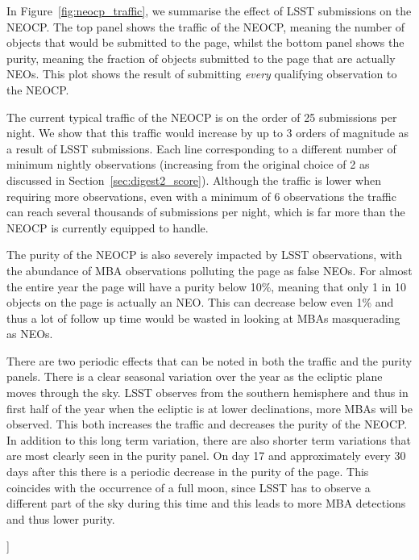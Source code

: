 \documentclass[twocolumn, twocolappendix]{aastex631}
\newcommand{\todo}[1]{{\color{red}{[TODO: #1}]}}
\begin{document}
In Figure~\ref{fig:neocp_traffic}, we summarise the effect of LSST submissions on the NEOCP. The top panel shows the traffic of the NEOCP, meaning the number of objects that would be submitted to the page, whilst the bottom panel shows the purity, meaning the fraction of objects submitted to the page that are actually NEOs. This plot shows the result of submitting \textit{every} qualifying observation to the NEOCP.

The current typical traffic of the NEOCP is on the order of 25 submissions per night. We show that this traffic would increase by up to 3 orders of magnitude as a result of LSST submissions. Each line corresponding to a different number of minimum nightly observations (increasing from the original choice of 2 as discussed in Section~\ref{sec:digest2_score}). Although the traffic is lower when requiring more observations, even with a minimum of 6 observations the traffic can reach several thousands of submissions per night, which is far more than the NEOCP is currently equipped to handle.

The purity of the NEOCP is also severely impacted by LSST observations, with the abundance of MBA observations polluting the page as false NEOs. For almost the entire year the page will have a purity below 10\%, meaning that only 1 in 10 objects on the page is actually an NEO. This can decrease below even 1\% and thus a lot of follow up time would be wasted in looking at MBAs masquerading as NEOs.

There are two periodic effects that can be noted in both the traffic and the purity panels. There is a clear seasonal variation over the year as the ecliptic plane moves through the sky. LSST observes from the southern hemisphere and thus in first half of the year when the ecliptic is at lower declinations, more MBAs will be observed. This both increases the traffic and decreases the purity of the NEOCP. In addition to this long term variation, there are also shorter term variations that are most clearly seen in the purity panel. On day 17 and approximately every 30 days after this there is a periodic decrease in the purity of the page. This coincides with the occurrence of a full moon, since LSST has to observe a different part of the sky during this time and this leads to more MBA detections and thus lower purity.

\todo{Check that I explained both of these effects correctly (particularly the moon one)}
\end{document}
